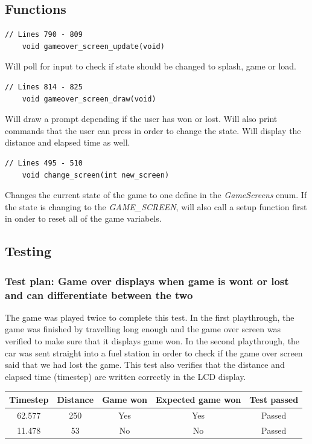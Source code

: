 \documentclass{article}
\begin{document}
\subsection*{Functions}
\begin{lstlisting}[style=CStyle]
	// Lines 790 - 809
	void gameover_screen_update(void)
\end{lstlisting}
Will poll  for input to check if state should be changed to splash, game or load.
\begin{lstlisting}[style=CStyle]
	// Lines 814 - 825
	void gameover_screen_draw(void)
\end{lstlisting}
Will draw a prompt depending if the user has won or lost. Will also print commands that the user can press in order to change the state. Will display the distance and elapsed time as well.
\begin{lstlisting}[style=CStyle]
	// Lines 495 - 510
	void change_screen(int new_screen)
\end{lstlisting}
Changes the current state of the game to one define in the \emph{GameScreens} enum. If the state is changing to the \emph{GAME\_SCREEN}, will also call a setup function first in onder to reset all of the game variabels. 
\newline

\subsection*{Testing}
\subsubsection*{Test plan: Game over displays when game is wont or lost and can differentiate between the two}
The game was played twice to complete this test. In the first playthrough, the game was finished by travelling long enough and the game over screen was verified to make sure that it displays game won. In the second playthrough, the car was sent straight into a fuel station in order to check if the game over screen said that we had lost the game. This test also verifies that the distance and elapsed time (timestep) are written correctly in the LCD display.
\begin{center}
\begin{tabular}{ c c c c c }
Timestep	& Distance	& Game won	& Expected game won	& Test passed	\\ \hline
62.577	& 250		& Yes		& Yes				& Passed		\\
11.478	& 53		& No		& No				& Passed		\\ \hline
\end{tabular}
\end{center}
\end{document}
